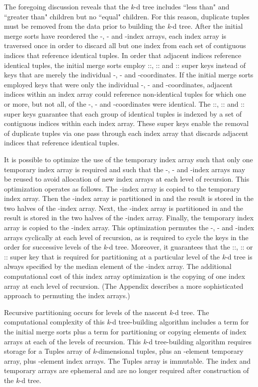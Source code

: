 \documentclass{sig-alternate}
\begin{document}
The foregoing discussion reveals that the \emph{k}-d tree includes ``less than" and ``greater than" children but no ``equal" children.  For this reason, duplicate  tuples must be removed from the data prior to building the \emph{k}-d tree.  After the  initial merge sorts have reordered the -, - and -index arrays, each index array is traversed once in order to discard all but one index from each set of contiguous indices that reference identical  tuples.  In order that adjacent indices reference identical  tuples, the  initial merge sorts employ ::, :: and :: super keys instead of keys that are merely the individual -, - and -coordinates.  If the  initial merge sorts employed keys that were only the individual -, - and -coordinates, adjacent indices within an index array could reference non-identical  tuples for which one or more, but not all, of the -, - and -coordinates were identical.  The ::, :: and :: super keys guarantee that each group of identical  tuples is indexed by a set of contiguous indices within each index array.  These super keys enable the removal of duplicate  tuples via one pass through each index array that discards adjacent indices that reference identical  tuples.

It is possible to optimize the use of the temporary index array such that only one temporary index array is required and such that the -, - and -index arrays may be reused to avoid allocation of new index arrays at each level of recursion.  This optimization operates as follows.  The -index array is copied to the temporary index array.  Then the -index array is partitioned in  and the result is stored in the two halves of the -index array.  Next, the -index array is partitioned in  and the result is stored in the two halves of the -index array.  Finally, the temporary index array is copied to the -index array.  This optimization permutes the -, - and -index arrays cyclically at each level of recursion, as is required to cycle the keys in the order  for successive levels of the \emph{k}-d tree.  Moreover, it guarantees that the ::, :: or :: super key that is required for partitioning at a particular level of the \emph{k}-d tree is always specified by the median element of the -index array.  The additional computational cost of this index array optimization is the copying of one index array at each level of recursion. (The Appendix describes a more sophisticated approach to permuting the index arrays.)

Recursive partitioning occurs for  levels of the nascent \emph{k}-d tree.  The computational complexity of this \emph{k}-d tree-building algorithm includes a  term for the  initial merge sorts plus a  term for partitioning or copying  elements of  index arrays at each of the  levels of recursion.  This  \emph{k}-d tree-building algorithm requires storage for a Tuples array of  \emph{k}-dimensional tuples, plus an -element temporary array, plus  -element index arrays.  The Tuples array is immutable.  The index and temporary arrays are ephemeral and are no longer required after construction of the \emph{k}-d tree.
\end{document}
